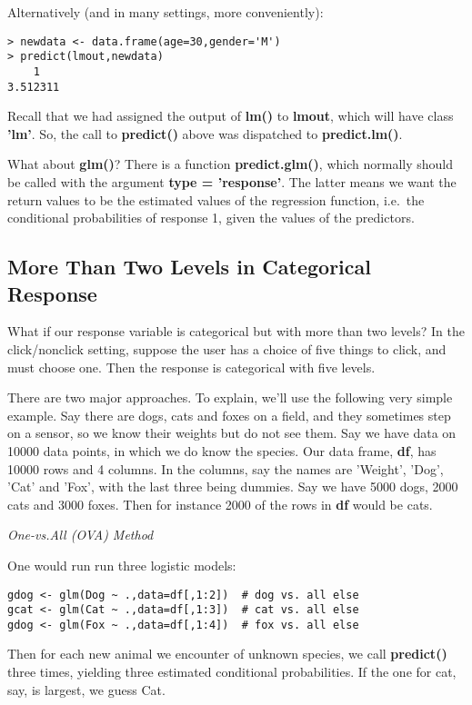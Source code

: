 Alternatively (and in many settings, more conveniently):

\begin{lstlisting}
> newdata <- data.frame(age=30,gender='M')
> predict(lmout,newdata)
    1 
3.512311 
\end{lstlisting}

Recall that we had assigned the output of \textbf{lm()} to
\textbf{lmout}, which will have class \textbf{'lm'}.  So, the call to
\textbf{predict()} above was dispatched to \textbf{predict.lm()}.

What about \textbf{glm()}?  There is a function \textbf{predict.glm()},
which normally should be called with the argument \textbf{type =
'response'}.  The latter means we want the return values to be the
estimated values of the regression function, i.e.\ the conditional
probabilities of response 1, given the values of the predictors.

\subsection{More Than Two Levels in Categorical Response}

What if our response variable is categorical but with more than two
levels?  In the click/nonclick setting, suppose the user has a choice of
five things to click, and must choose one.  Then the response is
categorical with five levels.  

There are two major approaches.  To explain, we'll use the following
very simple example. Say there are dogs, cats and foxes on a field, and
they sometimes step on a sensor, so we know their weights but do not see
them.  Say we have data on 10000 data points, in which we do know the
species.  Our data frame, \textbf{df}, has 10000 rows and 4 columns.  In
the columns, say the names are 'Weight', 'Dog', 'Cat' and 'Fox', with
the last three being dummies.  Say we have 5000 dogs, 2000 cats and 3000
foxes.  Then for instance 2000 of the rows in \textbf{df} would be cats.

\textit{One-vs.All (OVA) Method}

One would run run three logistic models:

\begin{lstlisting}
gdog <- glm(Dog ~ .,data=df[,1:2])  # dog vs. all else
gcat <- glm(Cat ~ .,data=df[,1:3])  # cat vs. all else
gdog <- glm(Fox ~ .,data=df[,1:4])  # fox vs. all else
\end{lstlisting}

Then for each new animal we encounter of unknown species, we call
\textbf{predict()} three times, yielding three estimated conditional
probabilities.  If the one for cat, say, is largest, we guess Cat.

